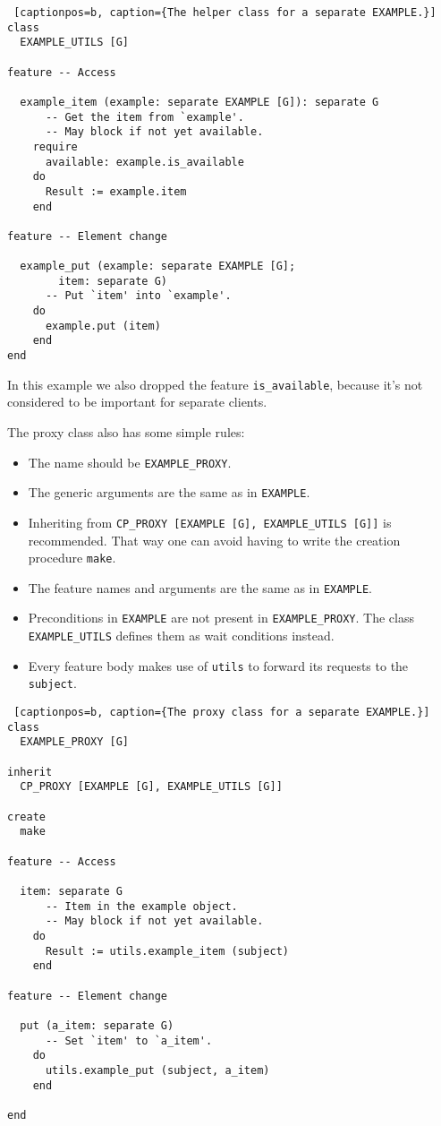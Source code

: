 \begin{lstlisting} [captionpos=b, caption={The helper class for a separate EXAMPLE.}]
class
  EXAMPLE_UTILS [G]
  
feature -- Access

  example_item (example: separate EXAMPLE [G]): separate G
      -- Get the item from `example'.
      -- May block if not yet available.
    require
      available: example.is_available
    do
      Result := example.item
    end

feature -- Element change
 
  example_put (example: separate EXAMPLE [G];
	    item: separate G)
      -- Put `item' into `example'.
    do
      example.put (item)
    end
end
\end{lstlisting}

In this example we also dropped the feature \lstinline!is_available!, because it's not considered to be important for separate clients.

The proxy class also has some simple rules:

 \begin{itemize}
  \item The name should be \lstinline!EXAMPLE_PROXY!.
  \item The generic arguments are the same as in \lstinline!EXAMPLE!.
  \item Inheriting from \lstinline!CP_PROXY [EXAMPLE [G], EXAMPLE_UTILS [G]]! is recommended.
  That way one can avoid having to write the creation procedure \lstinline!make!.
  \item The feature names and arguments are the same as in \lstinline!EXAMPLE!.
  \item Preconditions in \lstinline!EXAMPLE! are not present in \lstinline!EXAMPLE_PROXY!. 
  The class \lstinline!EXAMPLE_UTILS! defines them as wait conditions instead.
  \item Every feature body makes use of \lstinline!utils! to forward its requests to the \lstinline!subject!.
 \end{itemize}

\begin{lstlisting} [captionpos=b, caption={The proxy class for a separate EXAMPLE.}]
class
  EXAMPLE_PROXY [G]

inherit
  CP_PROXY [EXAMPLE [G], EXAMPLE_UTILS [G]]

create
  make
  
feature -- Access

  item: separate G
      -- Item in the example object.
      -- May block if not yet available.
    do
      Result := utils.example_item (subject)
    end

feature -- Element change

  put (a_item: separate G)
      -- Set `item' to `a_item'.
    do
      utils.example_put (subject, a_item)
    end

end
\end{lstlisting}

